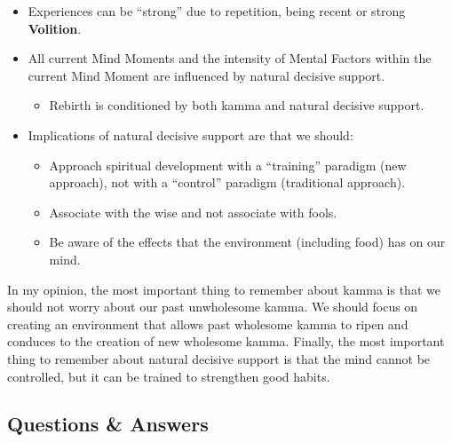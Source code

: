 \begin{itemize}
\begin{itemize}
\end{itemize}

\item Experiences can be “strong” due to repetition, being recent or strong \textbf{Volition}.

\item All current Mind Moments and the intensity of Mental Factors within the current Mind Moment are influenced by natural decisive support.

\begin{itemize}

\item Rebirth is conditioned by both kamma and natural decisive support.

\end{itemize}

\item Implications of natural decisive support are that we should:

\begin{itemize}

\item Approach spiritual development with a “training” paradigm (new approach), not with a “control” paradigm (traditional approach).

\item Associate with the wise and not associate with fools.

\item Be aware of the effects that the environment (including food) has on our mind.

\end{itemize}

\end{itemize}

In my opinion, the most important thing to remember about kamma is that we should not worry about our past unwholesome kamma. We should focus on creating an environment that allows past wholesome kamma to ripen and conduces to the creation of new wholesome kamma. Finally, the most important thing to remember about natural decisive support is that the mind cannot be controlled, but it can be trained to strengthen good habits.

\newpage

\subsection*{Questions \& Answers}


